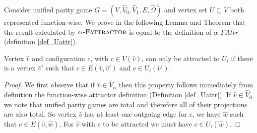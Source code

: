 Consider unified parity game $G = (V,\hat{V}_0,\hat{V}_1,E,\hat{\Omega})$ and vertex set $U \subseteq V$ both represented function-wise. We prove in the following Lemma and Theorem that the result calculated by $\alpha\textsc{-Fattractor}$ is equal to the definition of $\alpha\textit{-FAttr}$ (definition \ref{def_Uattr}).
\begin{lemma}
\label{lem_attr_requires_E}
Vertex $\hat{v}$ and configuration $c$, with $c \in V(\hat{v})$, can only be attracted to $U_i$ if there is a vertex $\hat{v}'$ such that $c \in E(\hat{v}, \hat{v}')$ and $c \in U_i(\hat{v}')$.
	\begin{proof}
		We first observe that if $\hat{v} \in \hat{V}_\alpha$ then this property follows immediately from definition the function-wise attractor definition (Definition \ref{def_Uattr}). If $\hat{v} \in \hat{V}_{\overline{\alpha}}$ we note that unified parity games are total and therefore all of their projections are also total. So vertex $\hat{v}$ has at least one outgoing edge for $c$, we have $\hat{w}$ such that $c \in E(\hat{v},\hat{w})$. For $\hat{v}$ with $c$ to be attracted we must have $c \in U_i(\hat{w})$.
	\end{proof}
\end{lemma}
